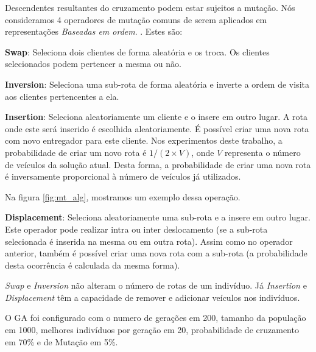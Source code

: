 Descendentes resultantes do cruzamento podem estar sujeitos a mutação. Nós consideramos 4 operadores de mutação comuns de serem aplicados em representações \textit{Baseadas em ordem}. \cite{Rocha}. Estes são:

\textbf{Swap}: Seleciona dois clientes de forma aleatória e os troca. Os clientes selecionados podem pertencer a mesma ou não.

\textbf{Inversion}: Seleciona uma sub-rota de forma aleatória e inverte a ordem de visita aos clientes pertencentes a ela.

\textbf{Insertion}: Seleciona aleatoriamente um cliente e o insere em outro lugar. A rota onde este será inserido é escolhida aleatoriamente. É possível criar uma nova rota com novo entregador para este cliente. Nos experimentos deste trabalho, a probabilidade de criar um novo rota é $1 / (2 \times V)$, onde $V$ representa o número de veículos da solução atual. Desta forma, a probabilidade de criar uma nova rota é inversamente proporcional à número de veículos já utilizados. 

Na figura \ref{fig:mt_alg}, mostramos um exemplo dessa operação.

\textbf{Displacement}: Seleciona aleatoriamente uma sub-rota e a insere em outro lugar. Este operador pode realizar intra ou inter deslocamento (se a sub-rota selecionada é inserida na
mesma ou em outra rota). Assim como no operador anterior, também é possível criar uma nova rota com a sub-rota (a probabilidade desta ocorrência é calculada da mesma forma).

\begin{center}
	\label{fig:mt_alg}
\end{center}


\textit{Swap} e \textit{Inversion} não alteram o número de rotas de um indivíduo. Já \textit{Insertion} e \textit{Displacement} têm a capacidade de remover e adicionar veículos nos indivíduos.

O GA foi configurado com o numero de gerações em 200, tamanho da população em 1000, melhores indivíduos por geração em 20, probabilidade de cruzamento em 70\% e de Mutação em 5\%.

